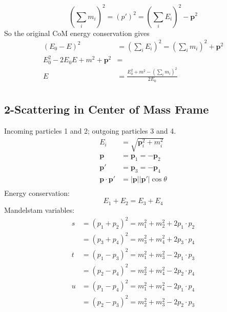 \documentclass[12pt]{article}
\theoremstyle{definition}
\begin{document}
\begin{equation*}
    \left( \sum_i m_i \right)^2 = (p')^2 = \left( \sum_i E_i \right)^2 - \bm{p}^2
\end{equation*}
So the original CoM energy conservation gives
\begin{equation*}
\begin{split}
    (E_0 - E)^2 &= \left( \sum_i E_i \right)^2 = \left( \sum_i m_i \right)^2 + \bm{p}^2 \\
    E_0^2 - 2E_0 E + m^2 + \bm{p}^2 &= \\
    E &= \frac{E_0^2 + m^2 - \left( \sum_i m_i \right)^2}{2E_0} \\
\end{split}
\end{equation*}

\subsection{2-Scattering in Center of Mass Frame}
Incoming particles 1 and 2; outgoing particles 3 and 4.
\begin{equation*}
\begin{split}
    E_i &= \sqrt{\bm{p}_i^2 + m_i^2} \\
    \bm{p} &= \bm{p}_1 = -\bm{p}_2 \\
    \bm{p}' &= \bm{p}_3 = - \bm{p}_4 \\
    \bm{p} \cdot \bm{p}' &= |\bm{p}| |\bm{p}'| \cos\theta \\
\end{split}
\end{equation*}
Energy conservation:
\begin{equation*}
    E_1 + E_2 = E_3 + E_4
\end{equation*}
Mandelstam variables:
\begin{equation*}
\begin{split}
    s &= (p_1 + p_2)^2 = m_1^2 + m_2^2 + 2 p_1 \cdot p_2 \\
      &= (p_3 + p_4)^2 = m_3^2 + m_4^2 + 2 p_3 \cdot p_4 \\
    t &= (p_1 - p_3)^2 = m_1^2 + m_3^2 - 2 p_1 \cdot p_3 \\
      &= (p_2 - p_4)^2 = m_2^2 + m_4^2 - 2 p_2 \cdot p_4 \\
    u &= (p_1 - p_4)^2 = m_1^2 + m_4^2 - 2 p_1 \cdot p_4 \\
      &= (p_2 - p_3)^2 = m_2^2 + m_3^2 - 2 p_2 \cdot p_3 \\
\end{split}
\end{equation*}
\end{document}
